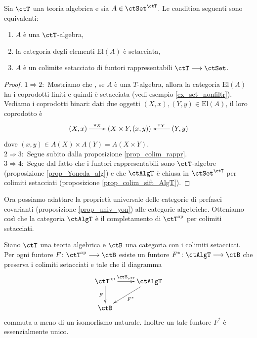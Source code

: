 \begin{proposition}\label{prop_alg_elsift}
 Sia \(\ctT\) una teoria algebrica e sia \(A \in \ctSet^{\ctT}\). Le condition seguenti sono equivalenti:
 \begin{enumerate}
  \item \(A\) è una \(\ctT\)-algebra,
  \item la categoria degli elementi \(\mathrm{El}(A)\) è setacciata,
  \item \(A\) è un colimite setacciato di funtori rappresentabili \( \ctT \fun \ctSet\).
 \end{enumerate}
\end{proposition}

\begin{proof}
 \(1 \Rightarrow 2 \colon\) Mostriamo che , se \(A\) è una \(T\)-algebra, allora la categoria \(\mathrm{El}(A)\) ha i coprodotti finiti e
 quindi è setacciata (vedi esempio \ref{ex_set_nonfiltr}). Vediamo i coprodotti binari: dati due oggetti \((X,x),(Y,y) \in \mathrm{El}(A)\),
 il loro coprodotto è
 \[\xymatrix{(X,x) \ar[r]^-{\pi_X} & (X \times Y, (x,y)) & (Y,y) \ar[l]_-{\pi_Y} }\]
 dove \((x,y) \in A(X) \times A(Y) = A(X \times Y)\). \\
 \(2 \Rightarrow 3 \colon\) Segue subito dalla proposizione \ref{prop_colim_rappr}. \\
 \(3 \Rightarrow 4 \colon\) Segue dal fatto che i funtori rappresentabili sono \(\ctT\)-algebre (proposizione \ref{prop_Yoneda_alg})
 e che \(\ctAlgT\) è chiusa in \(\ctSet^{\ctT}\) per colimiti setacciati (proposizione \ref{prop_colim_sift_AlgT}).
\end{proof}

Ora possiamo adattare la proprietà universale delle categorie di prefasci covarianti (proposizione \ref{prop_univ_yon})
alle categorie algebriche. Otteniamo così che la categoria \(\ctAlgT\) è il completamento di \(\ctT^{\op}\) per
colimiti setacciati.

\begin{proposition}\label{prop_univ_yon_alg}
 Siano \(\ctT\) una teoria algebrica e \(\ctB\) una categoria con i colimiti setacciati. Per ogni funtore \(F \colon \ctT^{\op} \fun \ctB\)
 esiste un funtore \(F^* \colon \ctAlgT \fun \ctB\) che preserva i colimiti setacciati e tale che il diagramma
 \[\xymatrix{\ctT^{\op} \ar[r]^-{\ctY_{\ctT}} \ar[d]_{F} & \ctAlgT \ar[ld]^{F^*} \\
  \ctB}\]
 commuta a meno di un isomorfismo naturale. Inoltre un tale funtore \(F^*\) è essenzialmente unico.
\end{proposition}

